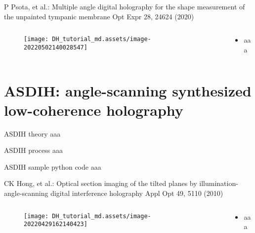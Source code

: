 \documentclass[t, aspectratio=169]{beamer}
\begin{document}
\begin{frame}{P Psota, et al.: Multiple angle digital holography for the shape measurement of the unpainted tympanic membrane}
	\vspace{-3 mm}
	\small Opt Expr  28, 24624 (2020)
	\begin{columns}
		\begin{column}{.6\textwidth}
			\begin{figure}
				\texttt{[image: DH\_tutorial\_md.assets/image-20220502140028547]}
			\end{figure}
		\end{column}
		\begin{column}{.4\textwidth}
			\begin{itemize}
				\item aaa
			\end{itemize}
		\end{column}
	\end{columns}
\end{frame}


\section{ASDIH: angle-scanning synthesized low-coherence holography}
\begin{frame}[c]
	\centering\LARGE\textbf{\secname}
\end{frame}



\begin{frame}{ASDIH theory}
aaa
\end{frame}


\begin{frame}{ASDIH process}
aaa
\end{frame}


\begin{frame}{ASDIH sample python code}
aaa
\end{frame}


\begin{frame}{CK Hong, et al.: Optical section imaging of the tilted planes by illumination-angle-scanning digital interference holography}
	\vspace{-3 mm}
	\small Appl Opt 49, 5110 (2010)
	\begin{columns}
		\begin{column}{.6\textwidth}
			\begin{figure}
				\texttt{[image: DH\_tutorial\_md.assets/image-20220429162140423]}
			\end{figure}
		\end{column}
		\begin{column}{.4\textwidth}
			\begin{itemize}
				\item aaa
			\end{itemize}
		\end{column}
	\end{columns}
\end{frame}
\end{document}
